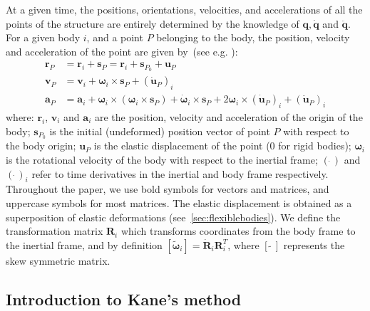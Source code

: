 \documentclass[wes, manuscript]{copernicus}
\renewcommand{\v}[1]{\boldsymbol{#1}}
\newcommand{\m}[1]{\boldsymbol{#1}}
\begin{document}
At a given time, the positions, orientations, velocities, and accelerations of all the points of the structure are entirely determined by the knowledge of $\v{q},\v{\dot{q}}$ and $\v{\ddot{q}}$. 
For a given body $i$, and a point $P$ belonging to the body, the position, velocity and acceleration of the point are given by~(see e.g. \cite{shabana:book}):
\begin{align}
\v{r}_P &= \v{r}_i + \v{s}_P = \v{r}_i+\v{s}_{P_0}+\v{u}_P\\
\v{v}_P &= \v{v}_i + \v{\omega}_i\times\v{s}_{P} + (\v{\dot{u}}_P)_i\\
\v{a}_P &= \v{a}_i + \v{\omega}_i\times(\v{\omega}_i\times \v{s}_P) 
        + \v{\dot{\omega}}_i\times\v{s}_{P}
        + 2\v{\omega}_i\times (\v{\dot{u}}_P)_i
        + (\v{\ddot{u}}_P)_i
\end{align}
where: $\v{r}_i$, $\v{v}_i$ and $\v{a}_i$ are the position, velocity and acceleration of the origin of the body; $\v{s}_{P_0}$ is the initial (undeformed) position vector of point $P$ with respect to the body origin; $\v{u}_P$ is the elastic displacement of the point ($0$ for rigid bodies); $\v{\omega}_i$ is the rotational velocity of the body with respect to the inertial frame;  $(\dot{\ })$ and $(\dot{\ })_i$ refer to time derivatives in the inertial and body frame respectively. 
Throughout the paper, we use bold symbols for vectors and matrices, and uppercase symbols for most matrices.
The elastic displacement is obtained as a superposition of elastic deformations (see~\autoref{sec:flexiblebodies}).
We define the transformation matrix $\m{R}_i$ which transforms coordinates from the body frame to the inertial frame, and by definition
$[\v{\tilde{{\omega}}}_i] = \v{\dot{R}}_i\v{R}_i^T$, where $[\tilde{\ \ }]$ represents the skew symmetric matrix. 








\subsection{Introduction to Kane's method}
\end{document}

